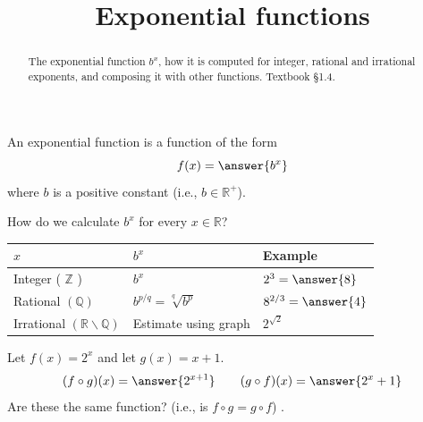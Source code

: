 \documentclass{ximera}
\title{Exponential functions}
\begin{document}
\begin{abstract}
The exponential function $b^x$, how it is computed for integer, rational and irrational exponents, and composing it with other functions. Textbook §1.4.
\end{abstract}
\maketitle
An exponential function is a function of the form
\[
f(x)= \answer{b^{x}}
\]
where $b$ is a positive constant (i.e., $b \in \mathbb{R}^{+}$).

How do we calculate $b^{x}$ for every $x \in \mathbb{R}$?

\begin{center}
\begin{tabular}[t]{|l|l|l|}
\hline
$x$ & $b^{x}$ & Example \\
\hline
Integer ( $\mathbb{Z}$ ) & $b^{x}$ & $2^{3}=\answer{8}$ \\
\hline
Rational $(\mathbb{Q})$ & $b^{p / q}=\sqrt[q]{b^{p}}$ & $8^{2/3}=\answer{4}$ \\
\hline
Irrational $(\mathbb{R} \backslash \mathbb{Q})$ & Estimate using graph & $2^{\sqrt{2}}$ \\
\hline
\end{tabular}
\end{center}

\begin{example}\label{example:1-10}
Let $f(x)=2^{x}$ and let $g(x)=x+1$.
\[
(f \circ g)(x) = \answer{2^{x+1}} \qquad (g \circ f)(x) = \answer{2^{x}+1}
\]
Are these the same function? (i.e., is $f \circ g=g \circ f$) .
\end{example}
\end{document}
